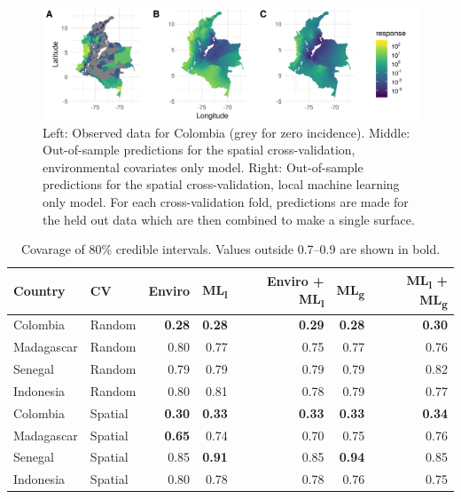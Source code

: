 \documentclass[review]{elsarticle}
\begin{document}



\begin{figure}
\centering
\includegraphics[width = 1\textwidth]{figs/col_comparison_map.png} %
\caption{
  Left: Observed data for Colombia (grey for zero incidence). Middle: Out-of-sample predictions for the spatial cross-validation, environmental covariates only model. Right: Out-of-sample predictions for the spatial cross-validation, local machine learning only model. For each cross-validation fold, predictions are made for the held out data which are then combined to make a single surface.
}
\label{f:map}
\end{figure}


\begin{table}[t!]
\caption{Covarage of 80\% credible intervals. Values outside 0.7--0.9 are shown in bold.}
\centering
\begin{tabular}{llrrrrr}
Country &  CV & Enviro & ML\textsubscript{l} &  Enviro + ML\textsubscript{l} & ML\textsubscript{g} & ML\textsubscript{l} + ML\textsubscript{g} \\
\hline 
 Colombia & Random & \textbf{0.28} & \textbf{0.28} & \textbf{0.29} & \textbf{0.28} & \textbf{0.30} \\
 Madagascar &  Random & 0.80 & 0.77& 0.75& 0.77& 0.76 \\
 Senegal & Random &0.79 & 0.79& 0.79& 0.79& 0.82 \\
 Indonesia & Random &0.80 & 0.81& 0.78& 0.79& 0.77  \\
 Colombia &  Spatial & \textbf{0.30} & \textbf{0.33}  & \textbf{0.33} & \textbf{0.33} & \textbf{0.34}  \\
 Madagascar & Spatial & \textbf{0.65} & 0.74& 0.70& 0.75 & 0.76   \\
 Senegal & Spatial & 0.85 & \textbf{0.91}& 0.85& \textbf{0.94} & 0.85  \\
  Indonesia & Spatial & 0.80 & 0.78& 0.78& 0.76& 0.75  \\
\end{tabular}
\label{t:coverage}
\end{table}
\end{document}
